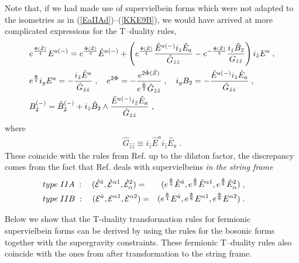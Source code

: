 \documentclass[a4paper,11pt]{article}
\begin{document}
Note that, if we had made use of  supervielbein forms which were not adapted 
to the isometries as in (\ref{EaIIAd})--(\ref{KKE9B}), 
we would have arrived at more complicated expressions for the 
T--duality rules,
\begin{eqnarray}\label{TE-nad}
& e^{{\Phi(\tilde{Z})\over 4}} E^{a(-)}= 
e^{{\hat{\Phi}(\tilde{Z})\over 4}}\hat{E}^{a(-)} + 
\left(e^{{\hat{\Phi}(\tilde{Z})\over 4}} 
{\hat{E}^{a(-)}i_{\hat{z}}\hat{E}_{a}\over \hat{G}_{\hat{z}\hat{z}}}
- e^{-{\hat{\Phi}(\tilde{Z})\over 4}} {i_{\hat{z}} \hat{B}_2 \over 
G_{\hat{z}\hat{z}}}\right)  i_{\hat{z}}E^a  \; , 
\\ \label{TEynad}
& e^{{\Phi\over 4}} i_yE^{a}= - {i_{\hat{z}}\hat{E}^{a}
\over \hat{G}_{\hat{z}\hat{z}}}\; , \quad 
e^{2{\Phi}} = - {e^{2\hat{\Phi}(\tilde{Z})}\over 
e^{{\hat{\Phi}\over 2}}\hat{G}_{\hat{z}\hat{z}}}\; , \quad 
i_yB_2 = - {\hat{E}^{a(-)} i_{\hat{z}}\hat{E}_{a}
\over 
\hat{G}_{\hat{z}\hat{z}}}\; , \quad 
\\ \label{TBnad}
& B_2^{(-)} = \hat{B}^{(-)}_2 + i_{\hat{z}}\hat{B}_2\wedge 
 {\hat{E}^{a(-)} i_{\hat{z}}\hat{E}_{a}
\over \hat{G}_{\hat{z}\hat{z}}} \; ,  
\end{eqnarray}
where 
\begin{eqnarray}\label{Gzz}
\hat{G}_{\hat{z}\hat{z}}\equiv i_{\hat{z}}\hat{E}^{a}i_{\hat{z}}\hat{E}_{a} 
\; .
\end{eqnarray}
These coincide with the rules from Ref. \cite{kulik} up to the dilaton 
factor, the discrepancy comes from the fact that Ref. \cite{kulik} deals 
with supervielbeins {\sl in the string frame}  
\begin{eqnarray}\label{Estr}
 & type \; IIA \; :  \quad  
({\hat{\cal E}}^{\hat{a}}, {\hat{\cal E}}^{\alpha 1}, 
{\hat{\cal E}}_{\alpha}^{2}) = & 
(e^{{\hat{\Phi}\over 4}} {\hat{E}}^{\hat{a}}, e^{{\hat{\Phi}\over 8}}
{\hat{E}}^{\alpha 1}, e^{{\hat{\Phi}\over 8}} {\hat{E}}_{\alpha}^{2})\; , 
 \qquad  \nonumber \\ & 
type \; IIB \; : \quad  
({{\cal E}}^{\hat{a}}, {{\cal E}}^{\alpha 1}, 
{{\cal E}}^{\alpha 2}) = & 
(e^{{{\Phi}\over 4}} {{E}}^{\hat{a}}, e^{{{\Phi}\over 8}}
{{E}}^{\alpha 1}, e^{{{\Phi}\over 8}} {{E}}^{\alpha 2})\; . \qquad 
\end{eqnarray}

Below we show that the T-duality transformation rules for fermionic 
supervielbein forms can  be derived by using the 
rules for the bosonic forms together with the supergravity 
constraints. These fermionic T--duality rules also coincide with the 
ones from \cite{kulik} after transformation to the string frame. 
\end{document}
